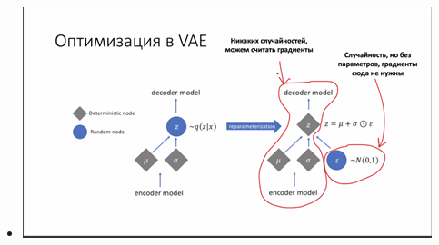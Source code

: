 \documentclass[a4paper, 12pt]{article}
\begin{document}
\begin{itemize}
  \begin{itemize}
  \item
    
    \includegraphics[width=4.68444in,height=2.64463in]{media/image17.png}
    
  \end{itemize}
\end{itemize}
\end{document}
